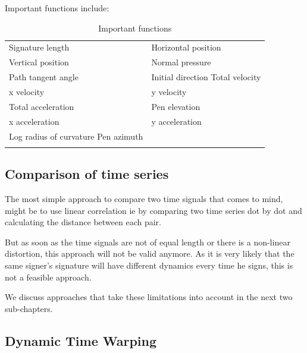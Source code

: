 \documentclass[a4paper, oneside]{csthesis}
\begin{document}
Important functions include: \cite{Gueler2008940}

\begin{table}[tb]
    \caption{Important functions}
    \label{fig:figurename}
    \begin{center}
        \begin{tabular}{p{6cm}|p{6cm}}
        \hline
Signature length  & Horizontal position  \\ \hdashline[0.5pt/3pt]
Vertical position  & Normal pressure  \\ \hdashline[0.5pt/3pt]
Path tangent angle & Initial direction Total velocity \\ \hdashline[0.5pt/3pt]
x velocity & y velocity \\ \hdashline[0.5pt/3pt]
Total acceleration & Pen elevation \\ \hdashline[0.5pt/3pt]
x acceleration & y acceleration \\ \hdashline[0.5pt/3pt]
Log radius of curvature Pen azimuth & \\ \hdashline[0.5pt/3pt]
        \hline
        \end{tabular}
    \end{center}
\end{table}


\subsection{Comparison of time series}

The most simple approach to compare two time signals that comes to mind, might be to use linear correlation \cite{Plamondon1989107} ie by comparing two time series dot by dot and calculating the distance between each pair.

But as soon as the time signals are not of equal length or there is a non-linear distortion, this approach will not be valid anymore. As it is very likely that the same signer's signature will have different dynamics every time he signs, this is not a feasible approach.

We discuss approaches that take these limitations into account in the next two sub-chapters.





\subsection{Dynamic Time Warping}
\end{document}

